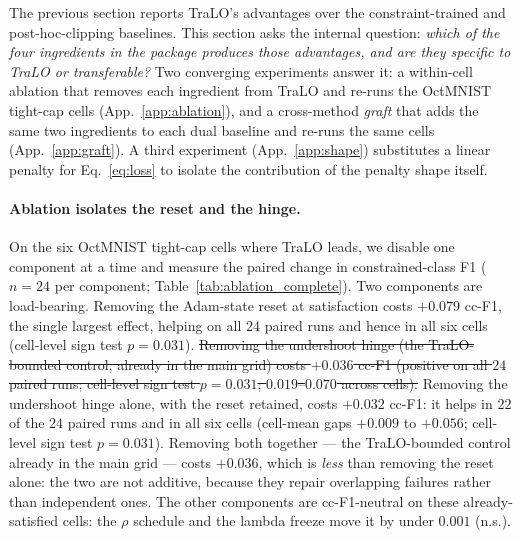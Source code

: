 \documentclass[10pt]{article}
\newcommand{\del}[1]{{\color{red}\sout{#1}}}
\begin{document}
The previous section reports TraLO's advantages over the constraint-trained
and post-hoc-clipping baselines. This section asks the internal question:
\emph{which of the four ingredients in the package produces those
advantages, and are they specific to TraLO or transferable?} Two
converging experiments answer it: a within-cell ablation that removes each
ingredient from TraLO and re-runs the OctMNIST tight-cap cells
(App.~\ref{app:ablation}), and a cross-method \emph{graft} that adds the
same two ingredients to each dual baseline and re-runs the same cells
(App.~\ref{app:graft}). A third experiment (App.~\ref{app:shape})
substitutes a linear penalty for Eq.~\eqref{eq:loss} to isolate the
contribution of the penalty shape itself.

\paragraph{Ablation isolates the reset and the hinge.}
On the six OctMNIST tight-cap cells where TraLO leads, we disable one
component at a time and measure the paired change in constrained-class F1
($n{=}24$ per component; Table~\ref{tab:ablation_complete}). Two
components are load-bearing. Removing the Adam-state reset at satisfaction
costs $+0.079$ cc-F1, the single largest effect, helping on all $24$
paired runs and hence in all six cells (cell-level sign test $p\!=\!0.031$).
\del{Removing the undershoot hinge (the TraLO-bounded control, already in the
main grid) costs \mbox{$+0.036$} cc-F1 (positive on all \mbox{$24$} paired runs;
cell-level sign test \mbox{$p\!=\!0.031$}; \mbox{$0.019$--$0.070$} across cells).}
{\color{blue}Removing the undershoot hinge alone, with the reset retained, costs
$+0.032$ cc-F1: it helps in $22$ of the $24$ paired runs and in all six cells
(cell-mean gaps $+0.009$ to $+0.056$; cell-level sign test $p\!=\!0.031$). Removing
both together --- the TraLO-bounded control already in the main grid --- costs
$+0.036$, which is \emph{less} than removing the reset alone: the two are not
additive, because they repair overlapping failures rather than independent ones.}
The other components are cc-F1-neutral on these already-satisfied cells: the
$\rho$ schedule and the lambda freeze move it by under $0.001$ (n.s.).
\end{document}
